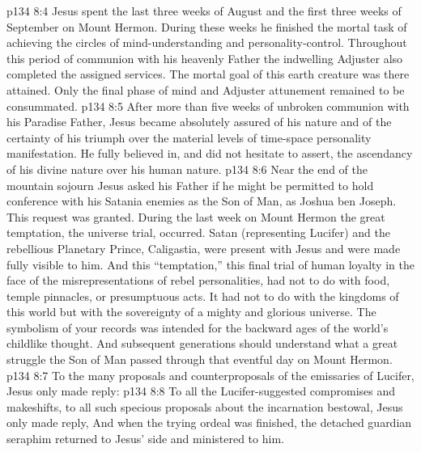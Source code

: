 \vs p134 8:4 Jesus spent the last three weeks of August and the first three weeks of September on Mount Hermon. During these weeks he finished the mortal task of achieving the circles of mind\hyp{}understanding and personality\hyp{}control. Throughout this period of communion with his heavenly Father the indwelling Adjuster also completed the assigned services. The mortal goal of this earth creature was there attained. Only the final phase of mind and Adjuster attunement remained to be consummated.
\vs p134 8:5 After more than five weeks of unbroken communion with his Paradise Father, Jesus became absolutely assured of his nature and of the certainty of his triumph over the material levels of time\hyp{}space personality manifestation. He fully believed in, and did not hesitate to assert, the ascendancy of his divine nature over his human nature.
\vs p134 8:6 \pc Near the end of the mountain sojourn Jesus asked his Father if he might be permitted to hold conference with his Satania enemies as the Son of Man, as Joshua ben Joseph. This request was granted. During the last week on Mount Hermon the great temptation, the universe trial, occurred. Satan (representing Lucifer) and the rebellious Planetary Prince, Caligastia, were present with Jesus and were made fully visible to him. And this “temptation,” this final trial of human loyalty in the face of the misrepresentations of rebel personalities, had not to do with food, temple pinnacles, or presumptuous acts. It had not to do with the kingdoms of this world but with the sovereignty of a mighty and glorious universe. The symbolism of your records was intended for the backward ages of the world’s childlike thought. And subsequent generations should understand what a great struggle the Son of Man passed through that eventful day on Mount Hermon.
\vs p134 8:7 To the many proposals and counterproposals of the emissaries of Lucifer, Jesus only made reply: 
\vs p134 8:8 To all the Lucifer\hyp{}suggested compromises and makeshifts, to all such specious proposals about the incarnation bestowal, Jesus only made reply,  And when the trying ordeal was finished, the detached guardian seraphim returned to Jesus’ side and ministered to him.
